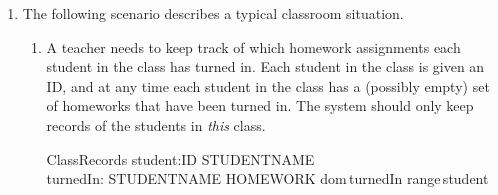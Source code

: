\documentclass{article}
\begin{document}
\begin{enumerate}
\begin{enumerate}
The hangoup operation is modeled as \\
$reqs' = reqs \setminus \{ c : const \vert ph? \in c \}$ \\
If $ph$ is not in $const$ then it returns an empty set, then $ reqs' = reqs \setminus \emptyset = reqs $ \\
\\
In order to make it more realistic, I propose adding a new output called success! with type $Success:== YES \vert NO$ \\
so that we can be more explicit about the success or failure of this opearation. \\
\color{black}
\item Modify Busy so that it also indicates which phones ph? is
connected to. What is the output if the input ph? is not connected
at all? \\
\color{blue}
I if not connected, dialled will return a $\emptyset$, else it will return a set with all the connections that ph has. \\
YesOrNo::= Yes $\vert$ No \\
\begin{schema}{BusyModified}
   Event \\
   ph?: PHONE \\
   activeConnections!:CONNECTION \\
   busy!:YesOrNo
   \where
   reqs' = reqs \\
   activeConnections! = \{ con : cons | ph \in con \}\\
   busy! = Yes \Leftrightarrow ph? \in \union cons 
   \end{schema}
\color{black}

\end{enumerate}

\item The following scenario describes a typical classroom
situation.

\begin{enumerate} \item A teacher needs to keep track of
which homework assignments each student in the class has turned
in. Each student in the class is given an ID, and at any time each
student in the class has a (possibly empty) set of homeworks that
have been turned in. The system should only keep records of the
students in {\em this\/} class.

\begin{zed}
\end{zed}
\begin{schema}{ClassRecords}
    student:ID \pfun STUDENTNAME \\
    turnedIn: STUDENTNAME \pfun \power HOMEWORK
\where
\color{blue}
dom\,turnedIn \subseteq range\,student 
\end{schema}


\end{enumerate}
\end{enumerate}
\end{document}
